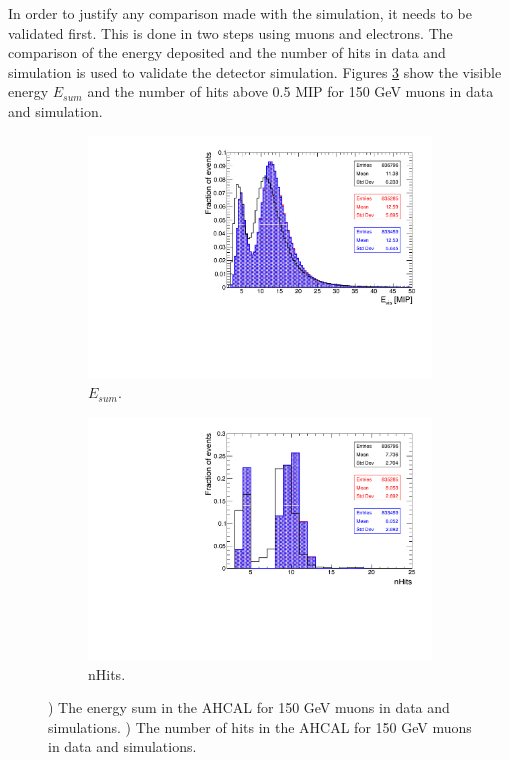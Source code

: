 In order to justify any comparison made with the simulation, it needs to be validated first. This is done in two steps using muons and electrons. The comparison of the energy deposited and the number of hits in data and simulation is used to validate the detector simulation. Figures \ref{fig:muVal} show the visible energy $E_{sum}$ and the number of hits above 0.5 MIP for 150 GeV muons in data and simulation.

\begin{figure}[htbp!]
  \centering
  \begin{subfigure}[t]{0.49\textwidth}
    \includegraphics[width=1.\linewidth]{chap5/fig_AHCAL_Timing/Muons/Validation_Evis_Muons.pdf}
    \caption{$E_{sum}$.} \label{fig:muEvis}
  \end{subfigure}
  \hfill
  \begin{subfigure}[t]{0.49\textwidth}
    \includegraphics[width=1.\linewidth]{chap5/fig_AHCAL_Timing/Muons/Validation_nHits_Muons.pdf}
    \caption{nHits.} \label{fig:munHits}
  \end{subfigure}
  \caption{) The energy sum in the AHCAL for 150 GeV muons in data and simulations. ) The number of hits in the AHCAL for 150 GeV muons in data and simulations.}
  \label{fig:muVal}
\end{figure}

